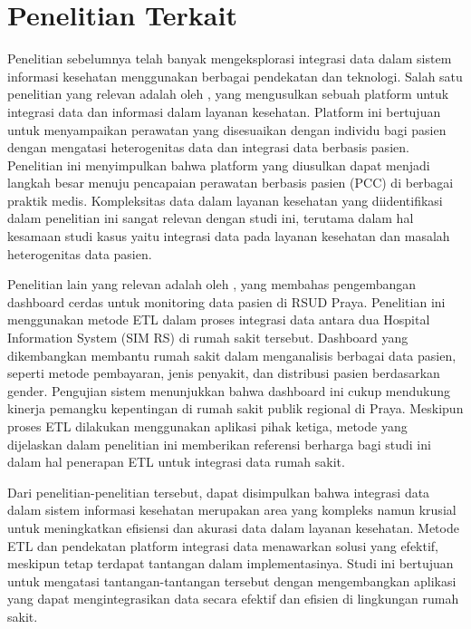 \section{Penelitian Terkait}
\label{sec:penelitianterkait}

Penelitian sebelumnya telah banyak mengeksplorasi integrasi data dalam sistem informasi kesehatan menggunakan berbagai pendekatan dan teknologi. Salah satu penelitian yang relevan adalah oleh \citet{JAYARATNE2019996}, yang mengusulkan sebuah platform untuk integrasi data dan informasi dalam layanan kesehatan. Platform ini bertujuan untuk menyampaikan perawatan yang disesuaikan dengan individu bagi pasien dengan mengatasi heterogenitas data dan integrasi data berbasis pasien. Penelitian ini menyimpulkan bahwa platform yang diusulkan dapat menjadi langkah besar menuju pencapaian perawatan berbasis pasien (PCC) di berbagai praktik medis. Kompleksitas data dalam layanan kesehatan yang diidentifikasi dalam penelitian ini sangat relevan dengan studi ini, terutama dalam hal kesamaan studi kasus yaitu integrasi data pada layanan kesehatan dan masalah heterogenitas data pasien.

Penelitian lain yang relevan adalah oleh \citet{mutawalli2021pengembangan}, yang membahas pengembangan dashboard cerdas untuk monitoring data pasien di RSUD Praya. Penelitian ini menggunakan metode ETL dalam proses integrasi data antara dua Hospital Information System (SIM RS) di rumah sakit tersebut. Dashboard yang dikembangkan membantu rumah sakit dalam menganalisis berbagai data pasien, seperti metode pembayaran, jenis penyakit, dan distribusi pasien berdasarkan gender. Pengujian sistem menunjukkan bahwa dashboard ini cukup mendukung kinerja pemangku kepentingan di rumah sakit publik regional di Praya. Meskipun proses ETL dilakukan menggunakan aplikasi pihak ketiga, metode yang dijelaskan dalam penelitian ini memberikan referensi berharga bagi studi ini dalam hal penerapan ETL untuk integrasi data rumah sakit.

Dari penelitian-penelitian tersebut, dapat disimpulkan bahwa integrasi data dalam sistem informasi kesehatan merupakan area yang kompleks namun krusial untuk meningkatkan efisiensi dan akurasi data dalam layanan kesehatan. Metode ETL dan pendekatan platform integrasi data menawarkan solusi yang efektif, meskipun tetap terdapat tantangan dalam implementasinya. Studi ini bertujuan untuk mengatasi tantangan-tantangan tersebut dengan mengembangkan aplikasi yang dapat mengintegrasikan data secara efektif dan efisien di lingkungan rumah sakit.
